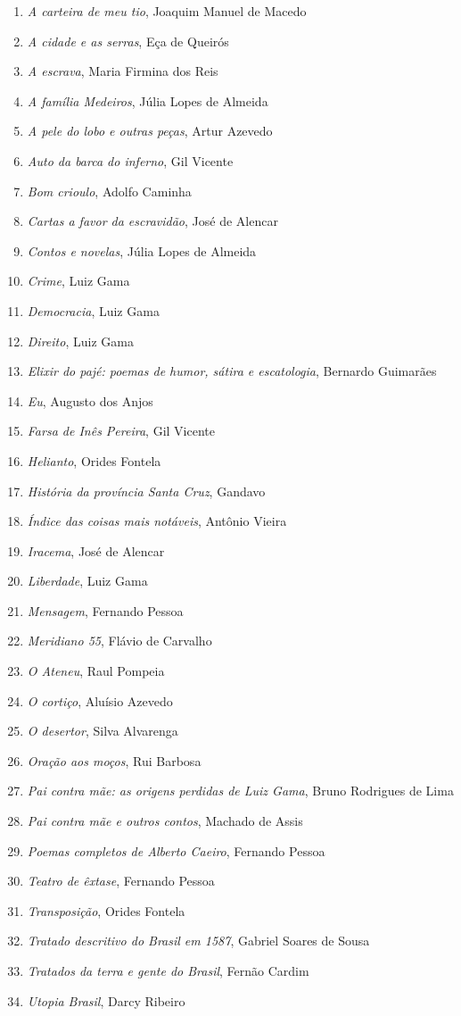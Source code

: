 \begin{enumerate}
\setlength{\topsep}{2pt}
\setlength{\partopsep}{0pt}
\setlength\parskip{4.2pt}
\setlength\itemsep{-1.4mm}
\item \textit{A carteira de meu tio}, Joaquim Manuel de Macedo
\item \textit{A cidade e as serras}, Eça de Queirós
\item \textit{A escrava}, Maria Firmina dos Reis
\item \textit{A família Medeiros}, Júlia Lopes de Almeida 
\item \textit{A pele do lobo e outras peças}, Artur Azevedo
\item \textit{Auto da barca do inferno}, Gil Vicente
\item \textit{Bom crioulo}, Adolfo Caminha
\item \textit{Cartas a favor da escravidão}, José de Alencar
\item \textit{Contos e novelas}, Júlia Lopes de Almeida
\item \textit{Crime}, Luiz Gama
\item \textit{Democracia}, Luiz Gama
\item \textit{Direito}, Luiz Gama
\item \textit{Elixir do pajé: poemas de humor, sátira e escatologia}, Bernardo Guimarães
\item \textit{Eu}, Augusto dos Anjos
\item \textit{Farsa de Inês Pereira}, Gil Vicente
\item \textit{Helianto}, Orides Fontela
\item \textit{História da província Santa Cruz}, Gandavo
\item \textit{Índice das coisas mais notáveis}, Antônio Vieira
\item \textit{Iracema}, José de Alencar
\item \textit{Liberdade}, Luiz Gama
\item \textit{Mensagem}, Fernando Pessoa
\item \textit{Meridiano 55}, Flávio de Carvalho
\item \textit{O Ateneu}, Raul Pompeia
\item \textit{O cortiço}, Aluísio Azevedo
\item \textit{O desertor}, Silva Alvarenga
\item \textit{Oração aos moços}, Rui Barbosa
\item \textit{Pai contra mãe: as origens perdidas de Luiz Gama}, Bruno Rodrigues de Lima
\item \textit{Pai contra mãe e outros contos}, Machado de Assis
\item \textit{Poemas completos de Alberto Caeiro}, Fernando Pessoa
\item \textit{Teatro de êxtase}, Fernando Pessoa
\item \textit{Transposição}, Orides Fontela
\item \textit{Tratado descritivo do Brasil em 1587}, Gabriel Soares de Sousa
\item \textit{Tratados da terra e gente do Brasil}, Fernão Cardim 
\item \textit{Utopia Brasil}, Darcy Ribeiro
\end{enumerate}
